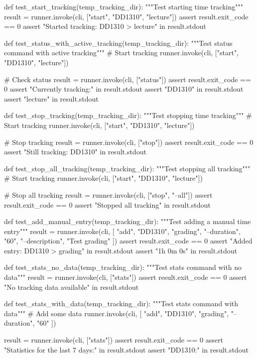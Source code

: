 def test_start_tracking(temp_tracking_dir):
    """Test starting time tracking"""
    result = runner.invoke(cli, ["start", "DD1310", "lecture"])
    assert result.exit_code == 0
    assert "Started tracking: DD1310 > lecture" in result.stdout

def test_status_with_active_tracking(temp_tracking_dir):
    """Test status command with active tracking"""
    # Start tracking
    runner.invoke(cli, ["start", "DD1310", "lecture"])
    
    # Check status
    result = runner.invoke(cli, ["status"])
    assert result.exit_code == 0
    assert "Currently tracking:" in result.stdout
    assert "DD1310" in result.stdout
    assert "lecture" in result.stdout

def test_stop_tracking(temp_tracking_dir):
    """Test stopping time tracking"""
    # Start tracking
    runner.invoke(cli, ["start", "DD1310", "lecture"])
    
    # Stop tracking
    result = runner.invoke(cli, ["stop"])
    assert result.exit_code == 0
    assert "Still tracking: DD1310" in result.stdout

def test_stop_all_tracking(temp_tracking_dir):
    """Test stopping all tracking"""
    # Start tracking
    runner.invoke(cli, ["start", "DD1310", "lecture"])
    
    # Stop all tracking
    result = runner.invoke(cli, ["stop", "--all"])
    assert result.exit_code == 0
    assert "Stopped all tracking" in result.stdout

def test_add_manual_entry(temp_tracking_dir):
    """Test adding a manual time entry"""
    result = runner.invoke(cli, [
        "add", "DD1310", "grading",
        "--duration", "60",
        "--description", "Test grading"
    ])
    assert result.exit_code == 0
    assert "Added entry: DD1310 > grading" in result.stdout
    assert "1h 0m 0s" in result.stdout

def test_stats_no_data(temp_tracking_dir):
    """Test stats command with no data"""
    result = runner.invoke(cli, ["stats"])
    assert result.exit_code == 0
    assert "No tracking data available" in result.stdout

def test_stats_with_data(temp_tracking_dir):
    """Test stats command with data"""
    # Add some data
    runner.invoke(cli, [
        "add", "DD1310", "grading",
        "--duration", "60"
    ])
    
    result = runner.invoke(cli, ["stats"])
    assert result.exit_code == 0
    assert "Statistics for the last 7 days:" in result.stdout
    assert "DD1310:" in result.stdout

